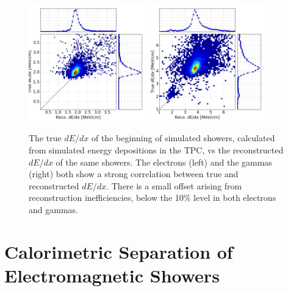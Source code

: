 \begin{figure}[htb]
  \centering
  \includegraphics[width=0.45\textwidth]{emshower_figures/e_true_reco_dedx_4cm.png}
  \includegraphics[width=0.45\textwidth]{emshower_figures/p_true_reco_dedx_4cm.png}
  \caption[$dE/dx$ Reconstruction/Monte Carlo Comparision]{The true $dE/dx$ of the beginning of simulated showers, calculated from simulated energy depositions in the TPC, vs the reconstructed $dE/dx$ of the same showers.  The electrons (left) and the gammas (right) both show a strong correlation between true and reconstructed $dE/dx$. There is a small offset arising from reconstruction inefficiencies, below the 10\% level in both electrons and gammas.}
  \label{fig:true_dedx}
\end{figure}

\FloatBarrier

\section{\label{sec:argo_dedx} Calorimetric Separation of Electromagnetic Showers}

